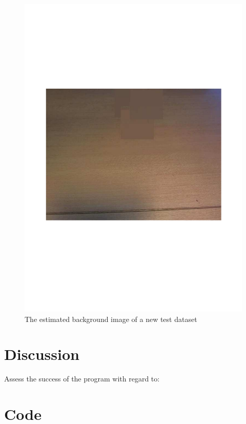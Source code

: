 \documentclass{article}
\begin{document}
\begin{figure}[h!]
\begin{minipage}[b]{0.5\linewidth}
\includegraphics[scale=0.3]{../Drawings/backdata10.pdf}
\caption{The estimated background image of a new test dataset}
\label{fig:backdata10}
\end{minipage}
\end{figure}


\section{Discussion}
\label{sec:discussion}
Assess the success of the program with regard to:



\section{Code}
\label{sec:code}
\end{document}
